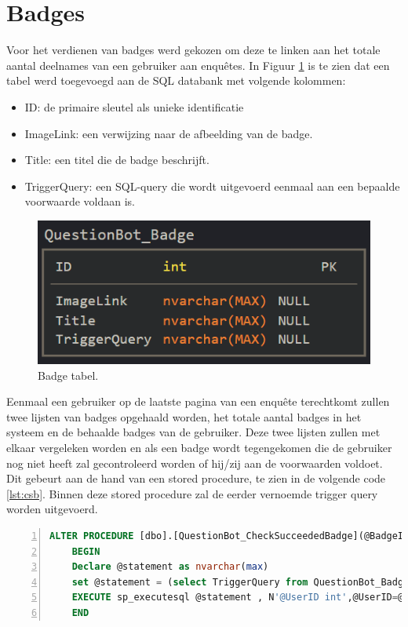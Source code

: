 \section{Badges}

Voor het verdienen van badges werd gekozen om deze te linken aan het totale aantal deelnames van een gebruiker aan enquêtes. In Figuur \ref{fig:badgetabel} is te zien dat een tabel werd toegevoegd aan de SQL databank met volgende kolommen:

\begin{itemize}
    \item ID: de primaire sleutel als unieke identificatie
    \item ImageLink: een verwijzing naar de afbeelding van de badge.
    \item Title: een titel die de badge beschrijft.
    \item TriggerQuery: een SQL-query die wordt uitgevoerd eenmaal aan een bepaalde voorwaarde voldaan is.
\end{itemize}

\begin{figure}
    \includegraphics[width=\linewidth]{BadgeTabel.png}
    \caption{Badge tabel.}
    \label{fig:badgetabel}
\end{figure}

Eenmaal een gebruiker op de laatste pagina van een enquête terechtkomt zullen twee lijsten van badges opgehaald worden, het totale aantal badges in het systeem en de behaalde badges van de gebruiker. Deze twee lijsten zullen met elkaar vergeleken worden en als een badge wordt tegengekomen die de gebruiker nog niet heeft zal gecontroleerd worden of hij/zij aan de voorwaarden voldoet. Dit gebeurt aan de hand van een stored procedure, te zien in de volgende code \ref{lst:csb}. Binnen deze stored procedure zal de eerder vernoemde trigger query worden uitgevoerd.


\begin{lstlisting}[caption={De CheckSucceededBadge stored procedure.},
    label={lst:csb},
    language=SQL,
    showspaces=false,
    basicstyle=\ttfamily,
    numbers=left,
    numberstyle=\tiny,
    numbersep=1pt,
    breaklines=true
    commentstyle=\color{gray}]
    ALTER PROCEDURE [dbo].[QuestionBot_CheckSucceededBadge](@BadgeID int, @UserID int) as
    BEGIN
    Declare @statement as nvarchar(max) 
    set @statement = (select TriggerQuery from QuestionBot_Badge where ID = @BadgeID) 
    EXECUTE sp_executesql @statement , N'@UserID int',@UserID=@UserID
    END
\end{lstlisting}


